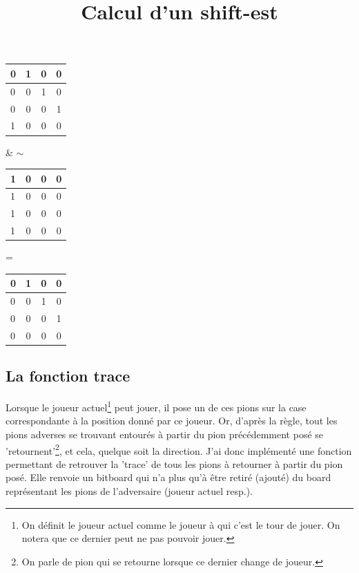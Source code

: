 \documentclass{report}
\begin{document}
\begin{center}
\renewcommand{\arraystretch} {1.5}
    \begin{tabular}{|p{0.2cm}|c|c|c|}
        \hline
        0 & 1 & 0 & 0\\
        \hline
        0 & 0 & 1 & 0 \\
        \hline
        0 & 0 & 0 & 1 \\
        \hline
        1 & 0 & 0 & 0 \\
        \hline
    \end{tabular}
    \& $\sim$
    \begin{tabular}{|p{0.2cm}|c|c|c|}
        \hline
        1 & 0 & 0 & 0\\
        \hline
        1 & 0 & 0 & 0 \\
        \hline
        1 & 0 & 0 & 0 \\
        \hline
        1 & 0 & 0 & 0 \\
        \hline
    \end{tabular}
    =
     \begin{tabular}{|p{0.2cm}|c|c|c|}
        \hline
        0 & 1 & 0 & 0\\
        \hline
        0 & 0 & 1 & 0 \\
        \hline
        0 & 0 & 0 & 1 \\
        \hline
        0 & 0 & 0 & 0 \\
        \hline
    \end{tabular}

\end{center}
\begin{center}
        \title{Calcul d'un shift-est}
\end{center}

\subsection{La fonction trace}
Lorsque le joueur actuel\footnote{On définit le joueur actuel comme le joueur à qui c'est le tour de jouer. On notera que ce dernier peut ne pas pouvoir jouer.} peut jouer, il pose un de ces pions sur la case correspondante à la position donné par ce joueur. Or, d’après la règle, tout les pions adverses se trouvant entourés à partir du pion précédemment posé se 'retournent'\footnote{On parle de pion qui se retourne lorsque ce dernier change de joueur.}, et cela, quelque soit la direction.
J’ai donc implémenté une fonction permettant de retrouver la 'trace' de tous les pions à retourner à partir du pion posé. Elle renvoie un bitboard qui n’a plus qu’à être retiré (ajouté) du board représentant les pions de l'adversaire (joueur actuel resp.).\newline
\end{document}
